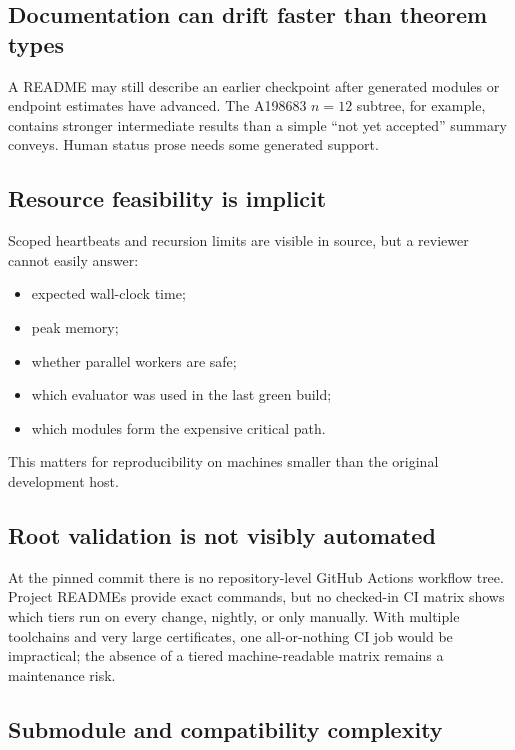 \documentclass[
  10pt,
  a4paper,
  twoside,
  open=any,
  parskip=half,
  headings=big
]{scrreprt}
\begin{document}
\subsection{Documentation can drift faster than theorem types}

A README may still describe an earlier checkpoint after generated modules or
endpoint estimates have advanced.  The A198683 \(n=12\) subtree, for example,
contains stronger intermediate results than a simple ``not yet accepted''
summary conveys.  Human status prose needs some generated support.

\subsection{Resource feasibility is implicit}

Scoped heartbeats and recursion limits are visible in source, but a reviewer
cannot easily answer:

\begin{itemize}
  \item expected wall-clock time;
  \item peak memory;
  \item whether parallel workers are safe;
  \item which evaluator was used in the last green build;
  \item which modules form the expensive critical path.
\end{itemize}

This matters for reproducibility on machines smaller than the original
development host.

\subsection{Root validation is not visibly automated}

At the pinned commit there is no repository-level GitHub Actions workflow
tree.  Project READMEs provide exact commands, but no checked-in CI matrix
shows which tiers run on every change, nightly, or only manually.  With
multiple toolchains and very large certificates, one all-or-nothing CI job
would be impractical; the absence of a tiered machine-readable matrix remains
a maintenance risk.

\subsection{Submodule and compatibility complexity}
\end{document}
